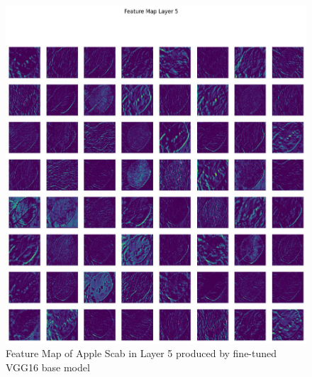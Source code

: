 \begin{figure}
    \centering
    \includegraphics[width=\linewidth]{graphics//chapter7/abr fmap layer5.png}
    \caption{Feature Map of Apple Scab in Layer 5 produced by fine-tuned VGG16 base model}
    \label{fig:abr-fmap2}
\end{figure}

